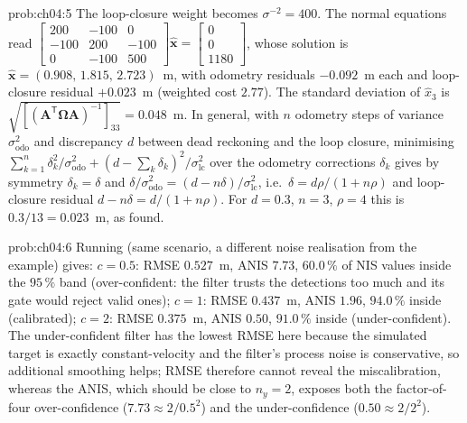 \begin{sol}{prob:ch04:5}
The loop-closure weight becomes $\sigma^{-2}=400$. The normal equations read
$\begin{bmatrix}200&-100&0\\-100&200&-100\\0&-100&500\end{bmatrix}\widehat{\mathbf{x}}=\begin{bmatrix}0\\0\\1180\end{bmatrix}$, whose solution is $\widehat{\mathbf{x}}=(0.908,\,1.815,\,2.723)$~m, with odometry residuals $-0.092$~m each and loop-closure residual $+0.023$~m (weighted cost $2.77$). The standard deviation of $\widehat{x}_3$ is $\sqrt{[(\mathbf{A}^{\mathsf T}\mathbf{\Omega}\mathbf{A})^{-1}]_{33}}=0.048$~m. In general, with $n$ odometry steps of variance $\sigma_{\mathrm{odo}}^{2}$ and discrepancy $d$ between dead reckoning and the loop closure, minimising $\sum_{k=1}^{n}\delta_k^{2}/\sigma_{\mathrm{odo}}^{2}+(d-\sum_k\delta_k)^{2}/\sigma_{\mathrm{lc}}^{2}$ over the odometry corrections $\delta_k$ gives by symmetry $\delta_k=\delta$ and $\delta/\sigma_{\mathrm{odo}}^{2}=(d-n\delta)/\sigma_{\mathrm{lc}}^{2}$, i.e.\ $\delta=d\rho/(1+n\rho)$ and loop-closure residual $d-n\delta=d/(1+n\rho)$. For $d=0.3$, $n=3$, $\rho=4$ this is $0.3/13=0.023$~m, as found.
\end{sol}
\begin{sol}{prob:ch04:6}
Running  (same scenario, a different noise realisation from the example) gives: $c=0.5$: RMSE $0.527$~m, ANIS $7.73$, $60.0\,\%$ of NIS values inside the $95\,\%$ band (over-confident: the filter trusts the detections too much and its gate would reject valid ones); $c=1$: RMSE $0.437$~m, ANIS $1.96$, $94.0\,\%$ inside (calibrated); $c=2$: RMSE $0.375$~m, ANIS $0.50$, $91.0\,\%$ inside (under-confident). The under-confident filter has the lowest RMSE here because the simulated target is exactly constant-velocity and the filter's process noise is conservative, so additional smoothing helps; RMSE therefore cannot reveal the miscalibration, whereas the ANIS, which should be close to $n_y=2$, exposes both the factor-of-four over-confidence ($7.73\approx 2/0.5^{2}$) and the under-confidence ($0.50\approx2/2^{2}$).
\end{sol}
